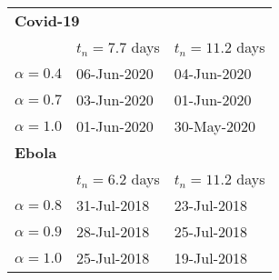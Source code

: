 \begin{tabular}{lll} 
\hline
\multicolumn{3}{l}{ \bf Covid-19} \\ 
 &  $t_n=7.7$ days & $t_n=11.2$ days \\ 
$\alpha=0.4$ & 06-Jun-2020 & 04-Jun-2020 \\ 
 $\alpha=0.7$ & 03-Jun-2020 & 01-Jun-2020 \\ 
 $\alpha=1.0$ & 01-Jun-2020 & 30-May-2020 \\ 
 \hline
\multicolumn{3}{l}{ \bf Ebola} \\ 
 &  $t_n=6.2$ days & $t_n=11.2$ days \\ 
$\alpha=0.8$ & 31-Jul-2018 & 23-Jul-2018 \\ 
 $\alpha=0.9$ & 28-Jul-2018 & 25-Jul-2018 \\ 
 $\alpha=1.0$ & 25-Jul-2018 & 19-Jul-2018 \\ 
 \hline
\end{tabular} 
